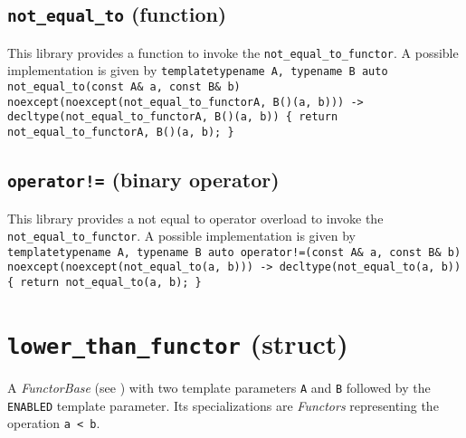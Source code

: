 \documentclass[oneside]{book}
\begin{document}
\subsection{\texttt{not\_equal\_to} (function)}
This library provides a function to invoke the \texttt{not\_equal\_to\_functor}.
A possible implementation is given by\newline
\texttt{template\textlangle typename A, typename B\textrangle\newline
auto\newline
not\_equal\_to(const A\& a, const B\& b)\newline
noexcept(noexcept(not\_equal\_to\_functor\textlangle A, B\textrangle()(a, b)))\newline
-> decltype(not\_equal\_to\_functor\textlangle A, B\textrangle()(a, b))\newline
\{ return not\_equal\_to\_functor\textlangle A, B\textrangle()(a, b); \}}

\subsection{\texttt{operator!=} (binary operator)}
This library provides a not equal to operator overload to invoke the \texttt{not\_equal\_to\_functor}.
A possible implementation is given by\newline
\texttt{
template\textlangle typename A, typename B\textrangle\newline
auto\newline
operator!=(const A\& a, const B\& b)\newline
noexcept(noexcept(not\_equal\_to(a, b)))\newline
-> decltype(not\_equal\_to(a, b))\newline
\{ return not\_equal\_to(a, b); \}}

\section{\texttt{lower\_than\_functor} (struct)}
A \textit{FunctorBase} (see \cite{functors}) with two template parameters \texttt{A} and \texttt{B} followed by the \texttt{ENABLED} template parameter.
Its specializations are \textit{Functors} representing the operation \texttt{a < b}.
\end{document}
